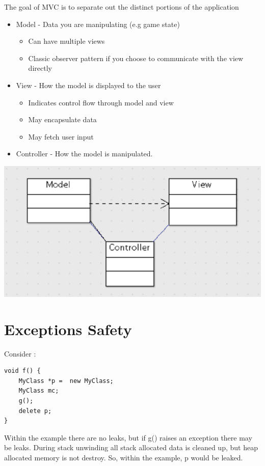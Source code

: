 \documentclass{article}
\begin{document}
The goal of MVC is to separate out the distinct portions of the application 
\begin{itemize}
\item Model - Data you are manipulating (e.g game state) 
\begin{itemize}
\item Can have multiple views 
\item Classic observer pattern if you choose to communicate with the view directly
\end{itemize}
\item View - How the model is displayed to the user 
\begin{itemize}
\item Indicates control flow through model and view
\item May encapsulate data
\item May fetch user input 
\end{itemize}
\item Controller - How the model is manipulated. 
\end{itemize}
\begin{center}
\includegraphics[scale=0.8]{lec10-3}
\end{center}


\section{Exceptions Safety}
Consider : 
\begin{lstlisting}
void f() {
	MyClass *p =  new MyClass;
	MyClass mc;
	g();
	delete p;
}
\end{lstlisting}

Within the example there are no leaks, but if g() raises an exception there may be leaks. During stack unwinding all stack allocated data is cleaned up, but heap allocated memory is not destroy.  So, within the example, p would be leaked. 
\end{document}
